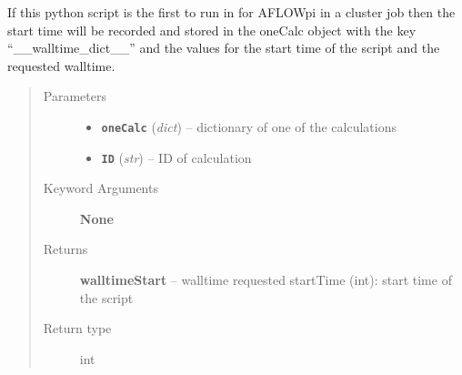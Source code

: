\documentclass[letterpaper,10pt,english]{sphinxmanual}
\begin{document}

\begin{fulllineitems}
\label{run:run.__setStartTime}
If this python script is the first to run in for AFLOWpi in a cluster job then
the start time will be recorded and stored in the oneCalc object with the key
``\_\_walltime\_dict\_\_'' and the values for the start time of the script and the
requested walltime.
\begin{quote}\begin{description}
\item[{Parameters}] \leavevmode\begin{itemize}
\item {} 
\textbf{\texttt{oneCalc}} (\emph{dict}) -- dictionary of one of the calculations

\item {} 
\textbf{\texttt{ID}} (\emph{str}) -- ID of calculation

\end{itemize}

\item[{Keyword Arguments}] \leavevmode
\textbf{None}

\item[{Returns}] \leavevmode
\textbf{walltimeStart} --
walltime requested
startTime (int): start time of the script

\item[{Return type}] \leavevmode
int

\end{description}\end{quote}

\end{fulllineitems}

\end{document}
